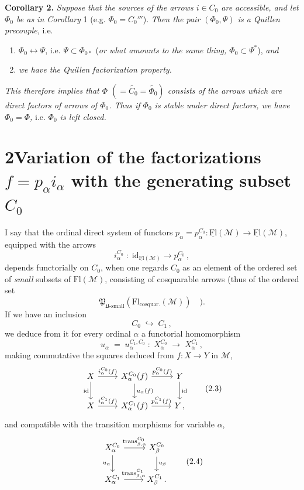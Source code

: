 \documentclass[11pt]{article}
\newcommand{\printedpage}[1]{\marginpar{\footnotesize p.~#1}}
\newcommand{\msp}[1]{\marginpar{\footnotesize [#1]}}
\newcommand{\uFl}{\underline{\mathrm{Fl}}}
\newcommand{\Fl}{\mathrm{Fl}}
\newcommand{\cM}{\mathcal{M}}
\begin{document}
\textbf{Corollary 2.} \textit{Suppose that the sources of the arrows $i\in C_0$ are accessible, and let $\Phi_0$ be as in Corollary} 1 (e.g. $\Phi_0=C_0'''$). \textit{Then the pair $(\Phi_0,\Psi)$ is a Quillen precouple,} i.e.
\begin{enumerate}[label={}, leftmargin=*]
\item[a)] $\Phi_0\longleftrightarrow\Psi$, i.e. $\Psi\subset\Phi_{0*}$ (\textit{or what amounts to the same thing, $\Phi_0\subset\Psi^*$}), \textit{and}
\item[b)] \textit{we have the Quillen factorization property.}
\end{enumerate}
\textit{This therefore implies that $\Phi$ $(=\widetilde{C_0}=\widetilde{\Phi_0})$ consists of the arrows which are direct factors of arrows of $\Phi_0$. Thus if $\Phi_0$ is stable under direct factors, we have $\Phi_0=\Phi$,} i.e. \textit{$\Phi_0$ is left closed.}

\printedpage{10}

\section*{2\quad Variation of the factorizations $f=p_\alpha i_\alpha$ with the generating subset $C_0$}

I say that the ordinal direct system of functors $p_\alpha=p_\alpha^{C_0} : \uFl(\cM)\longrightarrow\uFl(\cM)$,
\msp{page 13}
equipped with the arrows
\[
i_\alpha^{C_0} \;:\; \mathrm{id}_{\uFl(\cM)} \longrightarrow p_\alpha^{C_0}\,,
\]
depends functorially on $C_0$, when one regards $C_0$ as an element of the ordered set of \textit{small} subsets of $\Fl(\cM)$, consisting of cosquarable arrows (thus of the ordered set
\[
\mathfrak{P}_{\mathfrak{U}\text{-small}}(\Fl_{\text{cosquar.}}(\cM)) \quad ).
\]
If we have an inclusion
\[
C_0 \;\hookrightarrow\; C_1\,,
\tag*{(2.1)}
\]
we deduce from it for every ordinal $\alpha$ a functorial homomorphism
\[
u_\alpha \;=\; u_\alpha^{C_1,C_0} \;:\; X_\alpha^{C_0} \;\longrightarrow\; X_\alpha^{C_1}\,,
\tag*{(2.2)}
\]
making commutative the squares deduced from $f : X\longrightarrow Y$ in $\cM$,
\[
\begin{tikzcd}
X \arrow[r, "i_\alpha^{C_0}(f)"] \arrow[d, "\mathrm{id}"'] & X_\alpha^{C_0}(f) \arrow[r, "p_\alpha^{C_0}(f)"] \arrow[d, "u_\alpha(f)"] & Y \arrow[d, "\mathrm{id}"] \\
X \arrow[r, "i_\alpha^{C_1}(f)"] & X_\alpha^{C_1}(f) \arrow[r, "p_\alpha^{C_1}(f)"] & Y\,,
\end{tikzcd}
\tag*{(2.3)}
\]
and compatible with the transition morphisms for variable $\alpha$,
\[
\begin{tikzcd}
X_\alpha^{C_0} \arrow[r, "{\mathrm{trans}_{\beta,\alpha}^{C_0}}"] \arrow[d, "u_\alpha"'] & X_\beta^{C_0} \arrow[d, "u_\beta"] \\
X_\alpha^{C_1} \arrow[r, "{\mathrm{trans}_{\beta,\alpha}^{C_1}}"] & X_\beta^{C_1}\,.
\end{tikzcd}
\tag*{(2.4)}
\]
\end{document}
